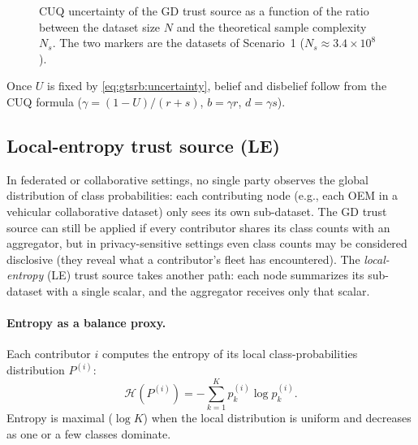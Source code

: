 \begin{figure}[!htbp]
  \centering
  \caption{\ac{CUQ} uncertainty of the GD trust source as a function of the ratio between the dataset size $N$ and the theoretical sample complexity $N_s$. The two markers are the datasets of Scenario~1 ($N_s \approx 3.4 \times 10^{8}$).}
  \label{fig:gtsrb:u-vs-n}
\end{figure}

Once $U$ is fixed by \cref{eq:gtsrb:uncertainty}, belief and disbelief follow from the \ac{CUQ} formula ($\gamma = (1-U)/(r+s)$, $b = \gamma r$, $d = \gamma s$).

\subsection{Local-entropy trust source (LE)}
\label{sec:dataset-trust:applications:gtsrb:method2}
In federated or collaborative settings, no single party observes the global distribution of class probabilities: each contributing node (e.g., each \ac{OEM} in a vehicular collaborative dataset) only sees its own sub-dataset. The GD trust source can still be applied if every contributor shares its class counts with an aggregator, but in privacy-sensitive settings even class counts may be considered disclosive (they reveal what a contributor's fleet has encountered). The \emph{local-entropy} (LE) trust source takes another path: each node summarizes its sub-dataset with a single scalar, and the aggregator receives only that scalar.

\paragraph{Entropy as a balance proxy.}
Each contributor $i$ computes the entropy of its local
class-probabilities distribution $P^{(i)}$:
\begin{equation}
\mathcal{H}(P^{(i)})
= -\sum_{k=1}^{K} p^{(i)}_k \log p^{(i)}_k.
\end{equation}
Entropy is maximal ($\log K$) when the local distribution is uniform and decreases as one or a few classes dominate.

